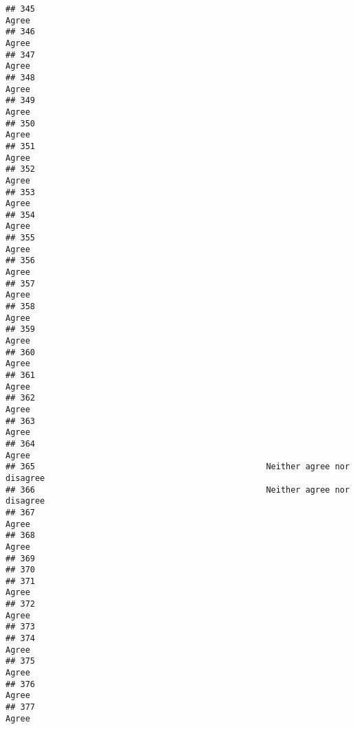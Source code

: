 \documentclass[
]{article}
\begin{document}
\begin{verbatim}
## 345                                                                    Agree
## 346                                                                    Agree
## 347                                                                    Agree
## 348                                                                    Agree
## 349                                                                    Agree
## 350                                                                    Agree
## 351                                                                    Agree
## 352                                                                    Agree
## 353                                                                    Agree
## 354                                                                    Agree
## 355                                                                    Agree
## 356                                                                    Agree
## 357                                                                    Agree
## 358                                                                    Agree
## 359                                                                    Agree
## 360                                                                    Agree
## 361                                                                    Agree
## 362                                                                    Agree
## 363                                                                    Agree
## 364                                                                    Agree
## 365                                               Neither agree nor disagree
## 366                                               Neither agree nor disagree
## 367                                                                    Agree
## 368                                                                    Agree
## 369                                                                         
## 370                                                                         
## 371                                                                    Agree
## 372                                                                    Agree
## 373                                                                         
## 374                                                                    Agree
## 375                                                                    Agree
## 376                                                                    Agree
## 377                                                                    Agree

\end{verbatim}
\end{document}
